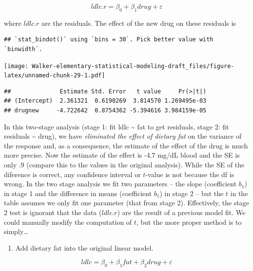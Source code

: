 \documentclass[]{book}
\providecommand{\tightlist}{%
  \setlength{\itemsep}{0pt}\setlength{\parskip}{0pt}}
\begin{document}
\begin{equation}
ldlc.r = \beta_0 + \beta_1 drug + \varepsilon
\label{eq:ancova-3}
\end{equation}

where \(ldlc.r\) are the residuals. The effect of the new drug on these
residuals is

\begin{verbatim}
## `stat_bindot()` using `bins = 30`. Pick better value with `binwidth`.
\end{verbatim}

\texttt{[image: Walker-elementary-statistical-modeling-draft\_files/figure-latex/unnamed-chunk-29-1.pdf]}

\begin{verbatim}
##              Estimate Std. Error   t value     Pr(>|t|)
## (Intercept)  2.361321  0.6190269  3.814570 1.269495e-03
## drugnew     -4.722642  0.8754362 -5.394616 3.984159e-05
\end{verbatim}

In this two-stage analysis (stage 1: fit ldlc \textasciitilde{} fat to
get residuals, stage 2: fit residuals \textasciitilde{} drug), we have
\emph{eliminated the effect of dietary fat} on the variance of the
response and, as a consequence, the estimate of the effect of the drug
is much more precise. Now the estimate of the effect is -4.7 mg/dL blood
and the SE is only .9 (compare this to the values in the original
analysis). While the SE of the diference is correct, any confidence
interval or \(t\)-value is not because the df is wrong. In the two stage
analysis we fit two parameters -- the slope (coefficient \(b_1\)) in
stage 1 and the difference in means (coefficient \(b_1\)) in stage 2 --
but the \(t\) in the table assumes we only fit one parameter (that from
stage 2). Effectively, the stage 2 test is ignorant that the data
(\(ldlc.r\)) are the result of a previous model fit. We could manually
modify the computation of \(t\), but the more proper method is to
simply\ldots{}

\begin{enumerate}
\def\labelenumi{\arabic{enumi}.}
\setcounter{enumi}{2}
\tightlist
\item
  Add dietary fat into the original linear model.
\end{enumerate}

\begin{equation}
ldlc = \beta_0 + \beta_1 fat + \beta_2 drug + \varepsilon
\end{equation}
\end{document}
